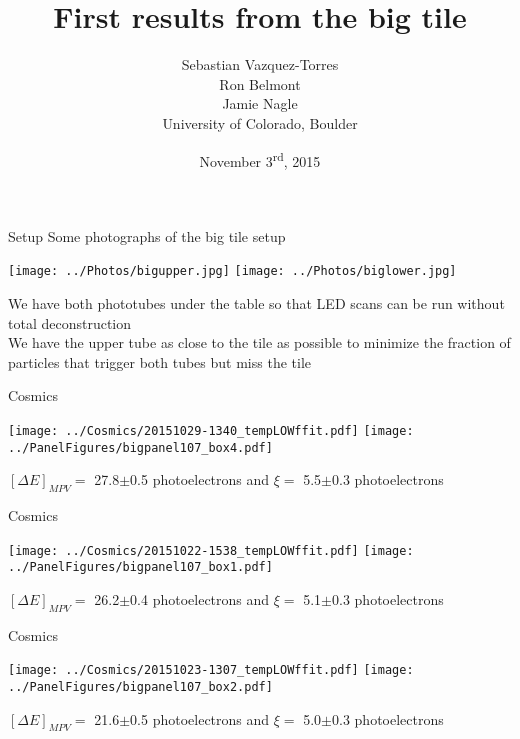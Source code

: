 \documentclass[compress,8pt]{beamer} %
\title[Nov 3, 2015 - Slide \insertframenumber]{First results from the big tile}
\author[CU-Boulder]{Sebastian Vazquez-Torres \\  Ron Belmont \\ Jamie Nagle \\ \vspace{20pt} University of Colorado, Boulder}
\date{November 3\textsuperscript{rd}, 2015}
\begin{document}
\begin{frame}
\titlepage
\end{frame}





\begin{frame}{Setup}
Some photographs of the big tile setup
\begin{adjustwidth}{-2em}{-2em}
\begin{center}
\texttt{[image: ../Photos/bigupper.jpg]}
\texttt{[image: ../Photos/biglower.jpg]}
\end{center}
\end{adjustwidth}
We have both phototubes under the table so that LED scans can be run without total deconstruction \\
We have the upper tube as close to the tile as possible to minimize the fraction of particles that
trigger both tubes but miss the tile
\end{frame}





\begin{frame}{Cosmics}
\begin{adjustwidth}{-2em}{-2em}
\begin{center}
\texttt{[image: ../Cosmics/20151029-1340\_tempLOWffit.pdf]}
\texttt{[image: ../PanelFigures/bigpanel107\_box4.pdf]}
\end{center}
\end{adjustwidth}
$[\Delta E]_{MPV} =$ 27.8$\pm$0.5 photoelectrons and $\xi =$ 5.5$\pm$0.3 photoelectrons \\
\end{frame}

\begin{frame}{Cosmics}
\begin{adjustwidth}{-2em}{-2em}
\begin{center}
\texttt{[image: ../Cosmics/20151022-1538\_tempLOWffit.pdf]}
\texttt{[image: ../PanelFigures/bigpanel107\_box1.pdf]}
\end{center}
\end{adjustwidth}
$[\Delta E]_{MPV} =$ 26.2$\pm$0.4 photoelectrons and $\xi =$ 5.1$\pm$0.3 photoelectrons \\
\end{frame}

\begin{frame}{Cosmics}
\begin{adjustwidth}{-2em}{-2em}
\begin{center}
\texttt{[image: ../Cosmics/20151023-1307\_tempLOWffit.pdf]}
\texttt{[image: ../PanelFigures/bigpanel107\_box2.pdf]}
\end{center}
\end{adjustwidth}
$[\Delta E]_{MPV} =$ 21.6$\pm$0.5 photoelectrons and $\xi =$ 5.0$\pm$0.3 photoelectrons \\
\end{frame}
\end{document}

